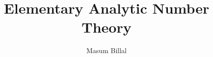 \documentclass[12pt,leqno]{book}
\title{Elementary Analytic Number Theory}
\author{Masum Billal}
\theoremstyle{definition}
\begin{document}
    \frontmatter
    \maketitle
    \tableofcontents
    
    \printnomenclature
    \mainmatter
    \begin{refsection}
        
        \printbibliography
    \end{refsection}

    \begin{refsection}
        
        \printbibliography
    \end{refsection}
    \backmatter
    \printglossary[type=\acronymtype,title={List of Acronyms}]
    \printglossary[title=Glossary]
    \printindex
\end{document}
